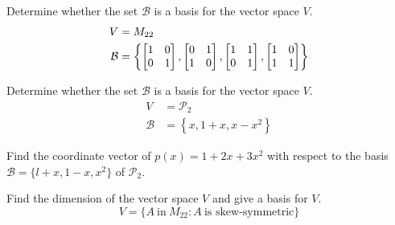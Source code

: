 \documentclass[oneperpage]{gsypset}
\begin{document}
	\begin{problem}[6.2.20]
		Determine whether the set $\mathcal{B}$ is a basis for the vector space $V$.
		\begin{align*}
			V &= M_{22} \\
			\mathcal{B} &= \left\{
					\begin{bmatrix}1&0\\0&1\end{bmatrix},
					\begin{bmatrix}0&1\\1&0\end{bmatrix},
					\begin{bmatrix}1&1\\0&1\end{bmatrix},
					\begin{bmatrix}1&0\\1&1\end{bmatrix}
				\right\}
		\end{align*}
	\end{problem}
	\begin{solution}
		
	\end{solution}
	
	\begin{problem}[6.2.25]
		Determine whether the set $\mathcal{B}$ is a basis for the vector space $V$.
		\begin{align*}
			V &= \mathscr{P}_2 \\
			\mathcal{B} &= \left\{
					x,
					1+x,
					x-x^2
				\right\}
		\end{align*}
	\end{problem}
	\begin{solution}
		
	\end{solution}
	
	\begin{problem}[6.2.28]
		Find the coordinate vector of $p(x) = 1 + 2x + 3x^2$ with respect to the basis 
		$\mathcal{B}=\{l+x,1-x,x^2\}$ of $\mathscr{P}_2$.
	\end{problem}
	\begin{solution}
		
	\end{solution}
	
	\begin{problem}[6.2.38]
		Find the dimension of the vector space $V$ and give a basis for $V$.
		\[
			V = \{A\ \text{in}\ M_{22} \colon A\ \text{is skew-symmetric}\}
		\]
	\end{problem}
	\begin{solution}
		
	\end{solution}
	
\end{document}
